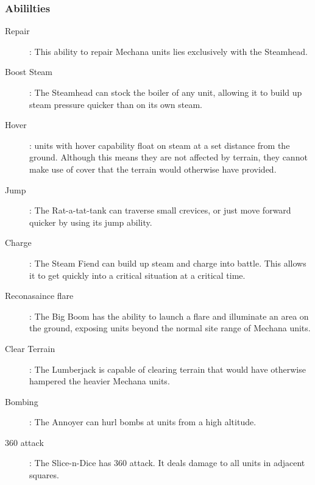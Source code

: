 \documentclass[a4paper]{article}
\begin{document}
\subsubsection{Abililties}
\begin{description}
\item[Repair]: This ability to repair Mechana units lies exclusively with the Steamhead.
\item[Boost Steam]: The Steamhead can stock the boiler of any unit, allowing it to build up steam pressure quicker than on its own steam.
\item[Hover]: units with hover capability float on steam at a set distance from the ground. Although this means they are not affected by terrain, they cannot make use of cover that the terrain would otherwise have provided.
\item[Jump]: The Rat-a-tat-tank can traverse small crevices, or just move forward quicker by using its jump ability.
\item[Charge]: The Steam Fiend can build up steam and charge into battle. This allows it to get quickly into a critical situation at a critical time.
\item[Reconasaince flare]: The Big Boom has the ability to launch a flare and illuminate an area on the ground, exposing units beyond the normal site range of Mechana units.
\item[Clear Terrain]: The Lumberjack is capable of clearing terrain that would have otherwise hampered the heavier Mechana units.
\item[Bombing]: The Annoyer can hurl bombs at units from a high altitude.
\item[360 attack]: The Slice-n-Dice has 360 attack. It deals damage to all units in adjacent squares.
\end{description}
\end{document}
